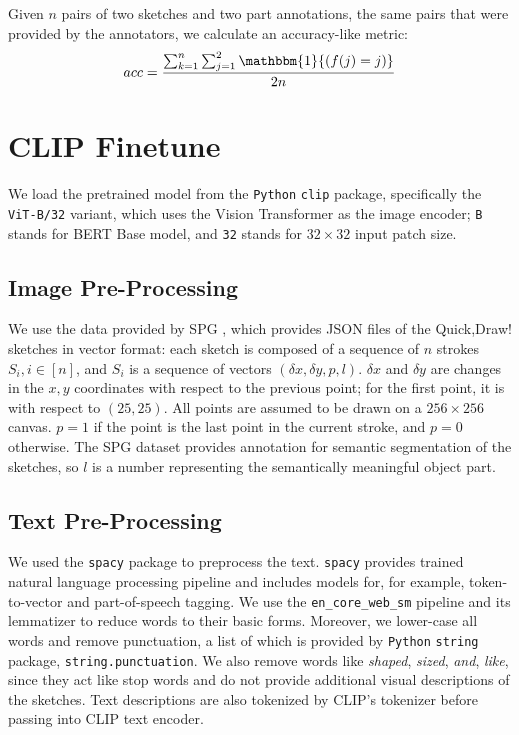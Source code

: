 Given $n$ pairs of two sketches and two part annotations, the same pairs that were provided by the annotators, we calculate an accuracy-like metric:
$$ acc = \frac{\sum_{k=1}^{n} \sum_{j=1}^2 \mathbbm{1}{(f(j) = j)}}{2n} $$

\section{CLIP Finetune}

We load the pretrained model from the \texttt{Python} \texttt{clip} package, specifically the \texttt{ViT-B/32} variant, which uses the Vision Transformer \citep{visiontransformer} as the image encoder; \texttt{B} stands for BERT Base model, and \texttt{32} stands for $32 \times 32$ input patch size. 

\subsection{Image Pre-Processing}
We use the data provided by SPG \citep{spg_paper}, which provides JSON files of the Quick,Draw! sketches in vector format: each sketch is composed of a sequence of $n$ strokes $S_i, i \in [n]$, and $S_i$ is a sequence of vectors $(\delta x,\delta y, p, l)$. $\delta x$ and $\delta y$ are changes in the $x,y$ coordinates with respect to the previous point; for the first point, it is with respect to $(25,25)$. All points are assumed to be drawn on a $256 \times 256$ canvas. $p=1$ if the point is the last point in the current stroke, and $p=0$ otherwise. The SPG dataset provides annotation for semantic segmentation of the sketches, so $l$ is a number representing the semantically meaningful object part.  


\subsection{Text Pre-Processing}
We used the \texttt{spacy} package to preprocess the text. \texttt{spacy} provides trained natural language processing pipeline and includes models for, for example, token-to-vector and part-of-speech tagging. We use the \texttt{en\_core\_web\_sm} pipeline and its lemmatizer to reduce words to their basic forms. Moreover, we lower-case all words and remove punctuation, a list of which is provided by \texttt{Python} \texttt{string} package, \texttt{string.punctuation}. We also remove words like \textit{shaped}, \textit{sized}, \textit{and}, \textit{like}, since they act like stop words and do not provide additional visual descriptions of the sketches. Text descriptions are also tokenized by CLIP's tokenizer before passing into CLIP text encoder.     

